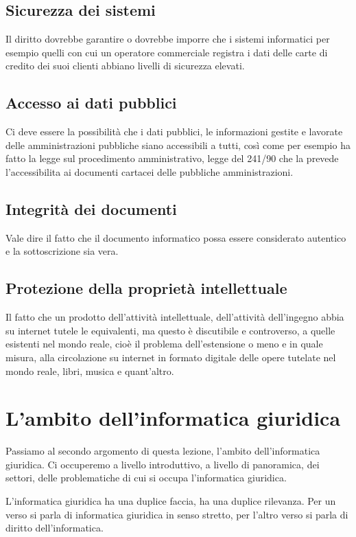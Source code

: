 \subsection{Sicurezza dei sistemi}
Il diritto dovrebbe garantire o dovrebbe imporre che i sistemi informatici per esempio quelli con cui un operatore commerciale registra i dati delle carte di credito dei suoi clienti abbiano livelli di sicurezza elevati.

\subsection{Accesso ai dati pubblici}
Ci deve essere la possibilità che i dati pubblici, le informazioni gestite e lavorate delle amministrazioni pubbliche siano accessibili a tutti, così come per esempio ha fatto la legge sul procedimento amministrativo, legge del 241/90 che la prevede l'accessibilita ai documenti cartacei delle pubbliche amministrazioni.

\subsection{Integrità dei documenti}
 Vale dire il fatto che il documento informatico possa essere considerato autentico e la sottoscrizione sia vera.

\subsection{Protezione della proprietà intellettuale} 
Il fatto che un prodotto dell'attività intellettuale, dell'attività dell'ingegno abbia su internet tutele le equivalenti, ma questo è discutibile e controverso, a quelle esistenti nel mondo reale, cioè il problema dell'estensione o meno e in quale misura, alla circolazione su internet in formato digitale delle opere tutelate nel mondo reale, libri, musica e quant'altro. 

\section{L'ambito dell'informatica giuridica}
Passiamo al secondo argomento di questa lezione, l'ambito dell'informatica giuridica. Ci occuperemo a livello introduttivo, a livello di panoramica, dei settori, delle problematiche di cui si occupa l'informatica giuridica. 

L'informatica giuridica ha una duplice faccia, ha una duplice rilevanza. Per un verso si parla di informatica giuridica in senso stretto, per l'altro verso si parla di diritto dell'informatica.

